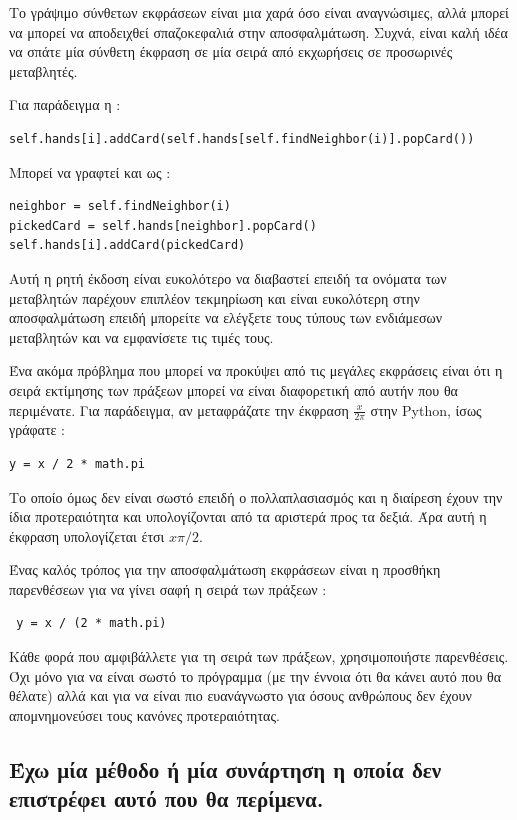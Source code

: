 \documentclass[10pt]{book}
\begin{document}
Το γράψιμο σύνθετων εκφράσεων είναι μια χαρά όσο είναι αναγνώσιμες, αλλά μπορεί 
να μπορεί να αποδειχθεί σπαζοκεφαλιά στην αποσφαλμάτωση. Συχνά, είναι καλή ιδέα να σπάτε μία σύνθετη έκφραση σε μία σειρά από εκχωρήσεις σε προσωρινές μεταβλητές. 

Για παράδειγμα η :


\begin{verbatim}
self.hands[i].addCard(self.hands[self.findNeighbor(i)].popCard())
\end{verbatim}
%
 Μπορεί να γραφτεί και ως :

\begin{verbatim}
neighbor = self.findNeighbor(i)
pickedCard = self.hands[neighbor].popCard()
self.hands[i].addCard(pickedCard)
\end{verbatim}
%
 Αυτή η ρητή έκδοση είναι ευκολότερο να διαβαστεί επειδή τα ονόματα των μεταβλητών παρέχουν επιπλέον τεκμηρίωση και είναι ευκολότερη στην αποσφαλμάτωση επειδή μπορείτε να ελέγξετε τους τύπους των ενδιάμεσων μεταβλητών και να εμφανίσετε τις τιμές τους.

Ένα ακόμα πρόβλημα που μπορεί να προκύψει από τις μεγάλες εκφράσεις είναι ότι η σειρά εκτίμησης των πράξεων μπορεί να είναι διαφορετική από αυτήν που θα περιμένατε. Για παράδειγμα, αν μεταφράζατε την έκφραση  $\frac{x}{2 \pi}$  στην  Python,  ίσως γράφατε :

\begin{verbatim}
y = x / 2 * math.pi
\end{verbatim}
%
 Το οποίο όμως δεν είναι σωστό επειδή ο πολλαπλασιασμός και η διαίρεση έχουν την ίδια προτεραιότητα και υπολογίζονται από τα αριστερά προς τα δεξιά.  Άρα αυτή η έκφραση υπολογίζεται έτσι  $x \pi / 2$.

 Ένας καλός τρόπος για την αποσφαλμάτωση εκφράσεων είναι η προσθήκη παρενθέσεων για να γίνει σαφή η σειρά των πράξεων :

\begin{verbatim}
 y = x / (2 * math.pi)
\end{verbatim}
%
 Κάθε φορά που αμφιβάλλετε για τη σειρά των πράξεων, χρησιμοποιήστε παρενθέσεις. Όχι μόνο για να είναι σωστό το πρόγραμμα (με την έννοια ότι θα κάνει αυτό που θα θέλατε) αλλά και για να είναι πιο ευανάγνωστο για όσους ανθρώπους δεν έχουν απομνημονεύσει τους κανόνες προτεραιότητας.


\subsection{Έχω μία μέθοδο ή μία συνάρτηση η οποία δεν επιστρέφει αυτό που θα περίμενα.}
\end{document}
